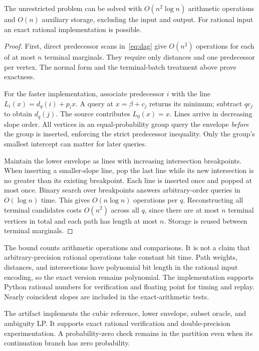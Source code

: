 \documentclass[runningheads]{llncs}
\begin{document}
\begin{theorem}\label{thm:algorithm}
The unrestricted problem can be solved with $O(n^2\log n)$ arithmetic
operations and $O(n)$ auxiliary storage, excluding the input and output.
For rational input an exact rational implementation is possible.
\end{theorem}
\begin{proof}
First, direct predecessor scans in~\eqref{eq:dag} give $O(n^2)$ operations
for each of at most $n$ terminal marginals. They require only distances and
one predecessor per vertex. The normal form and the terminal-batch treatment
above prove exactness.

For the faster implementation, associate predecessor $i$ with the line
$L_i(x)=d_q(i)+p_i x$. A query at $x=\beta+c_j$ returns its minimum; subtract
$qc_j$ to obtain $d_q(j)$. The source contributes $L_0(x)=x$.
Lines arrive in decreasing slope order. All vertices in an equal-probability
group query the envelope \emph{before} the group is inserted, enforcing the
strict predecessor inequality. Only the group's smallest intercept can
matter for later queries.

Maintain the lower envelope as lines with increasing intersection
breakpoints. When inserting a smaller-slope line, pop the last line while
its new intersection is no greater than its existing breakpoint. Each line
is inserted once and popped at most once. Binary search over breakpoints
answers arbitrary-order queries in $O(\log n)$ time. This gives
$O(n\log n)$ operations per $q$. Reconstructing all terminal candidates
costs $O(n^2)$ across all $q$, since there are at most $n$ terminal vertices
in total and each path has length at most $n$. Storage is reused between
terminal marginals.
\end{proof}
The bound counts arithmetic operations and comparisons. It is not a claim
that arbitrary-precision rational operations take constant bit time.
Path weights, distances, and intersections have polynomial bit length in
the rational input encoding, so the exact version remains polynomial.
The implementation supports Python rational numbers for verification and
floating point for timing and replay. Nearly coincident slopes are included
in the exact-arithmetic tests.

The artifact implements the cubic reference, lower envelope, subset oracle,
and ambiguity LP. It supports exact rational verification and double-precision
experimentation. A probability-zero check remains in the partition even when
its continuation branch has zero probability.
\end{document}
